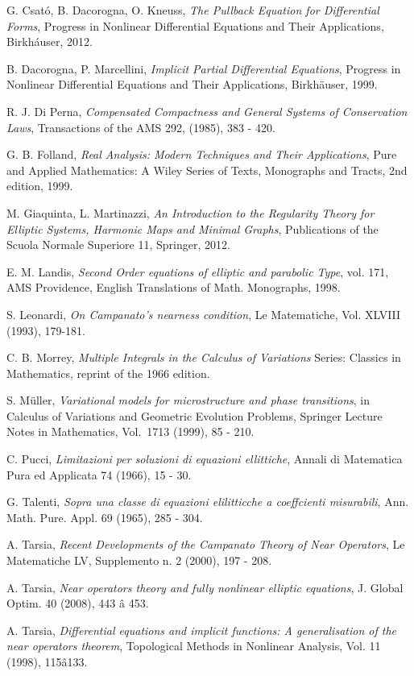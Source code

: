 \documentclass{amsart}
\theoremstyle{definition}
\numberwithin{equation}{section}
\begin{document}
\begin{thebibliography}{30}
 G. Csat\'o, B. Dacorogna, O. Kneuss, \emph{The Pullback Equation for Differential Forms}, Progress in Nonlinear Differential Equations and Their Applications, Birkh\'auser, 2012.

 B. Dacorogna,  P. Marcellini, \emph{Implicit Partial Differential Equations}, Progress in Nonlinear Differential Equations and Their Applications, Birkh\"auser, 1999.

 R. J. Di Perna, \emph{Compensated Compactness and General Systems of Conservation Laws}, Transactions of the AMS 292, (1985), 383 - 420.

 G. B. Folland, \emph{Real Analysis: Modern Techniques and Their Applications}, Pure and Applied Mathematics: A Wiley Series of Texts, Monographs and Tracts, 2nd edition, 1999.

 M. Giaquinta, L. Martinazzi, \emph{An Introduction to the Regularity Theory for Elliptic Systems, Harmonic Maps and Minimal Graphs}, Publications of the Scuola Normale Superiore 11, Springer, 2012.
 
 E. M. Landis, \emph{Second Order equations of elliptic and parabolic Type}, vol. 171, AMS Providence, English Translations of Math. Monographs, 1998.

 S. Leonardi, \emph{On Campanato's nearness condition}, Le Matematiche, Vol. XLVIII (1993), 179-181.

 C. B. Morrey, \emph{Multiple Integrals in the Calculus of Variations} Series: Classics in Mathematics, reprint of the 1966 edition.

 S. M\"uller, \emph{Variational models for microstructure and phase transitions}, in Calculus of Variations and Geometric Evolution Problems, Springer Lecture Notes in Mathematics, Vol.\ 1713 (1999), 85 - 210.

 C. Pucci, \emph{Limitazioni per soluzioni di equazioni ellittiche}, Annali di Matematica Pura ed Applicata 74 (1966),  15 - 30.

 G. Talenti, \emph{Sopra una classe di equazioni elilitticche a coeffcienti misurabili}, Ann.
Math. Pure. Appl. 69 (1965), 285 - 304.

 A. Tarsia, \emph{Recent Developments of the Campanato Theory of Near Operators}, Le Matematiche LV, Supplemento n. 2 (2000), 197 - 208.

 A. Tarsia, \emph{Near operators theory and fully nonlinear elliptic equations}, J. Global Optim. 40 (2008), 443 â 453.

 A. Tarsia, \emph{Differential equations and implicit functions: A generalisation of the near operators theorem}, Topological Methods in Nonlinear Analysis, Vol. 11 (1998), 115â133.

\end{thebibliography}
\end{document}

